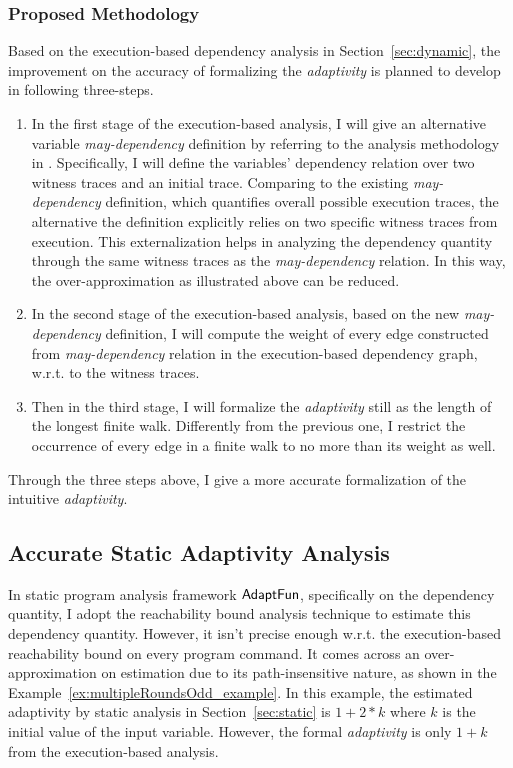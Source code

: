 \subsubsection{Proposed Methodology}
\label{subsubsec:furthers-dep-depth}
% 
Based on the execution-based dependency analysis in Section~\ref{sec:dynamic}, the improvement on the accuracy 
of formalizing the
\emph{adaptivity} is planned to develop in following three-steps.
\begin{enumerate}
\item In the first stage of the execution-based analysis, 
I will give an alternative variable \emph{may-dependency} definition 
by referring to the analysis methodology in \cite{Cousot19a}.
%
Specifically, I will define the variables' dependency relation over two witness traces and an initial trace. Comparing to 
the existing \emph{may-dependency} definition, which quantifies overall possible execution traces, the alternative
the definition explicitly relies on two specific witness traces from execution.
This externalization helps in analyzing the dependency quantity through the same 
witness traces as the \emph{may-dependency} relation. In this way, the over-approximation as illustrated above
can be reduced.
%
\item In the second stage of the execution-based analysis, 
based on the new \emph{may-dependency} definition,
I will compute the weight of every edge constructed from 
\emph{may-dependency} relation in the execution-based dependency graph, w.r.t. to the witness traces.
%
\item Then in the third stage, I will formalize the \emph{adaptivity} still as the 
length of the longest finite walk. Differently from the previous one, I restrict 
the occurrence of every edge in a finite walk to no more than its weight as well.
\end{enumerate}
Through the three steps above, I give a more accurate formalization of the intuitive \emph{adaptivity}.
%
\subsection{Accurate Static Adaptivity Analysis}
\label{subsec:furthers-reachability}
In static program analysis framework $\textsf{AdaptFun}$, specifically on the dependency quantity, 
I adopt the reachability bound analysis technique to estimate this dependency quantity.
However, it isn't precise enough w.r.t. the execution-based reachability bound on every program command.
It comes across an over-approximation on estimation due to its path-insensitive nature,
as shown in the Example~\ref{ex:multipleRoundsOdd_example}.
In this example, the estimated adaptivity by static analysis in Section~\ref{sec:static} 
is $1 + 2*k$ where $k$ is the initial value of the input variable.
However, the formal \emph{adaptivity} is only $1 + k$ from the execution-based analysis.

